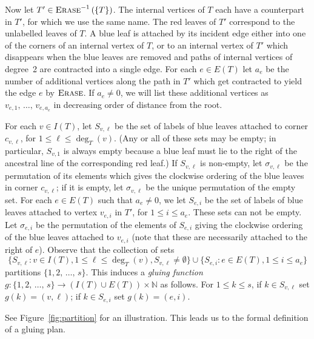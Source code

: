 \documentclass[10pt]{amsart}
\theoremstyle{definition}\newtheorem{defi}[theo]{Definition}\newtheorem{rema}[theo]{Remark}\newtheorem{exam}[theo]{Example}\newtheorem{exem}[theo]{Example}\newtheorem{nota}[theo]{Notation}
\newcommand{\N}{\mathbb{N}}
\begin{document}
Now let $T'\in \textsc{Erase}^{-1}\left(\{T\}\right)$. The internal vertices of $T$ each have a counterpart in $T'$, for which we use the same name. The red leaves of $T'$ correspond to the unlabelled leaves of $T$. A blue leaf is attached by its incident edge either into one of the corners of an internal vertex of $T$, or to an internal vertex of $T'$ which disappears when the blue leaves are removed and paths of internal vertices of degree~2 are contracted into a single edge. For each $e \in E(T)$ let $a_e$ be the number of additional vertices along the path in $T'$ which get contracted to yield the edge $e$ by $\textsc{Erase}$. If $a_e \neq 0$, we will list these additional vertices as $v_{e, 1}, \,\ldots,\,v_{e,a_e}$ in decreasing order of distance from the root.


For each $v \in I(T)$, let $S_{v, \ell}$ be the set of labels of blue leaves attached to corner $c_{v, \ell}$, for $1 \le \ell \le \deg_T(v)$. (Any or all of these sets may be empty; in particular, $S_{v,1}$ is always empty because a blue leaf must lie to the right of the ancestral line of the corresponding red leaf.) If $S_{v,\ell}$ is non-empty, let $\sigma_{v,\ell}$ be the permutation of its elements which gives the clockwise ordering of the blue leaves in corner $c_{v,\ell}$; if it is empty, let $\sigma_{v,\ell}$ be the unique permutation of the empty set. For each $e \in E(T)$ such that $a_e \neq 0$, we let $S_{e,i}$ be the set of labels of blue leaves attached to vertex $v_{e,i}$ in $T'$, for $1 \le i \le a_e$. These sets can not be empty. Let $\sigma_{e,i}$ be the permutation of the elements of $S_{e,i}$ giving the clockwise ordering of the blue leaves attached to $v_{e,i}$ (note that these are necessarily attached to the right of $e$). Observe that the collection of sets
\[
\big\{ S_{v,\ell} : v \in I(T), 1 \le \ell \le \deg_T(v), S_{v,\ell} \neq \emptyset\big\} \cup \big\{ S_{e,i}: e \in E(T), 1 \le i \le a_e\big\}
\]
partitions $\{1,2,\,\ldots,\,s\}$. This induces a \emph{gluing function} $g: \{1,2,\,\ldots,\,s\} \to (I(T) \cup E(T)) \times \N$ as follows. For $1 \le k \le s$, if $k \in S_{v,\ell}$ set $g(k) = (v,\ell)$; if $k \in S_{e,i}$ set $g(k) = (e,i)$.

See Figure~\ref{fig:partition} for an illustration. This leads us to the formal definition of a gluing plan.
\end{document}
